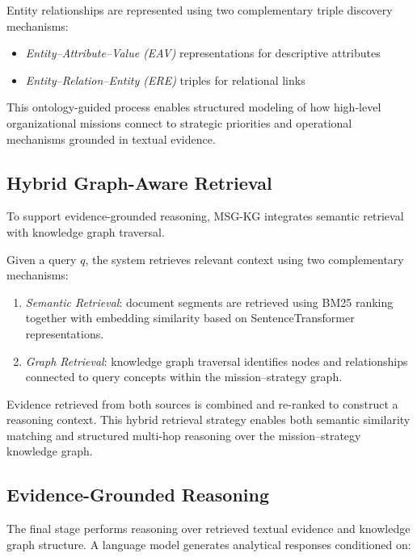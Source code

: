 \documentclass[11pt]{article}
\begin{document}
Entity relationships are represented using two complementary triple discovery mechanisms:
\begin{itemize}[leftmargin=1.0em, itemsep=0.05em, topsep=0.05em]
\item \textit{Entity--Attribute--Value (EAV)} representations for descriptive attributes
\item \textit{Entity--Relation--Entity (ERE)} triples for relational links
\end{itemize}

This ontology-guided process enables structured modeling of how high-level organizational missions connect to strategic priorities and operational mechanisms grounded in textual evidence.

\subsection{Hybrid Graph-Aware Retrieval}

To support evidence-grounded reasoning, MSG-KG integrates semantic retrieval with knowledge graph traversal.

Given a query $q$, the system retrieves relevant context using two complementary mechanisms:

\begin{enumerate}[leftmargin=1.0em, itemsep=0.05em, topsep=0.05em]
\item \textit{Semantic Retrieval}: document segments are retrieved using BM25 ranking together with embedding similarity based on SentenceTransformer representations.
\item \textit{Graph Retrieval}: knowledge graph traversal identifies nodes and relationships connected to query concepts within the mission--strategy graph.
\end{enumerate}

Evidence retrieved from both sources is combined and re-ranked to construct a reasoning context. This hybrid retrieval strategy enables both semantic similarity matching and structured multi-hop reasoning over the mission--strategy knowledge graph.

\subsection{Evidence-Grounded Reasoning}

The final stage performs reasoning over retrieved textual evidence and knowledge graph structure. A language model generates analytical responses conditioned on:
\end{document}
